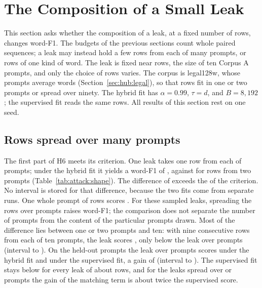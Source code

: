 \section{The Composition of a Small Leak}\label{sec:attack:leak}

This section asks whether the composition of a leak, at a fixed number of rows, changes word-F1.
The budgets of the previous sections count whole paired sequences; a leak may instead hold a few rows from each of many prompts, or rows of one kind of word.
The leak is fixed near  rows, the size of ten Corpus A prompts, and only the choice of rows varies.
The corpus is legal128w, whose prompts average  words (Section~\ref{sec:hub:legal}), so that  rows fit in one or two prompts or spread over ninety.
The hybrid fit has $\alpha = 0.99$, $\tau = d$, and $B = 8{,}192$; the supervised fit reads the same rows. %
All results of this section rest on one seed.

\subsection{Rows spread over many prompts}\label{sec:attack:leak:spread}

The first part of H6 meets its criterion.
One leak takes one row from each of  prompts; under the hybrid fit it yields a word-F1 of , against  for  rows from two prompts (Table~\ref{tab:attack:shape}).
The difference of  exceeds the  of the criterion. %
No interval is stored for that difference, because the two fits come from separate runs.
One whole prompt of  rows scores . %
For these sampled leaks, spreading the rows over prompts raises word-F1; the comparison does not separate the number of prompts from the content of the particular prompts drawn.
Most of the difference lies between one or two prompts and ten: with nine consecutive rows from each of ten prompts, the leak scores , only  below the leak over  prompts (interval  to ). %
On the  held-out prompts the leak over  prompts scores  under the hybrid fit and  under the supervised fit, a gain of  (interval  to ). %
The supervised fit stays below  for every leak of about  rows, and for the leaks spread over  or  prompts the gain of the matching term is about twice the supervised score.

